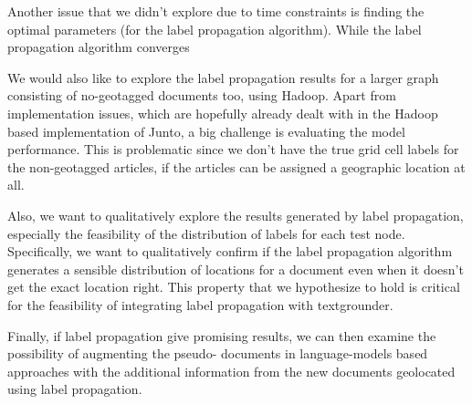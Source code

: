 \par Another issue that we didn't explore due to time constraints is finding the optimal parameters (for the label propagation algorithm). While the label propagation algorithm converges

\par We would also like to explore the label propagation results for a larger graph consisting of no-geotagged documents too, using
Hadoop. Apart from implementation issues, which are hopefully already dealt with in the Hadoop based implementation of Junto, a big challenge is evaluating the model performance. This is problematic since we don't have the true grid cell labels for the non-geotagged articles, if the articles can be assigned a geographic location at all.

\par Also, we want to qualitatively explore the results generated by label propagation, especially the feasibility  of the distribution of labels for each test node. Specifically, we want to qualitatively confirm if the label propagation algorithm generates a sensible distribution of locations for a document even when it doesn't get the exact location right. This property that we hypothesize to hold is critical for the feasibility of integrating label propagation with textgrounder.

\par Finally, if label propagation
give promising results, we can then examine the possibility of augmenting the
pseudo- documents in language-models based approaches with the additional
information from the new documents geolocated using label propagation.

